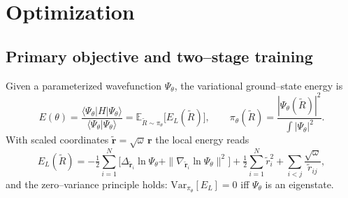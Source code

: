\chapter{Optimization}
\label{ch:optimization}

\section{Primary objective and two–stage training}
\label{sec:opt-overview}

Given a parameterized wavefunction $\Psi_\theta$, the variational ground–state energy is
\begin{equation}
E(\theta)
=\frac{\langle\Psi_\theta|H|\Psi_\theta\rangle}{\langle\Psi_\theta|\Psi_\theta\rangle}
=\mathbb{E}_{\tilde{R}\sim \pi_\theta}\!\big[E_L(\tilde{R})\big],
\qquad
\pi_\theta(\tilde{R})=\frac{|\Psi_\theta(\tilde{R})|^2}{\int |\Psi_\theta|^2}.
\end{equation}
With scaled coordinates $\tilde{\mathbf r}=\sqrt{\omega}\,\mathbf r$ the local energy reads
\begin{equation}
\label{eq:local-energy}
E_L(\tilde{R})
= -\tfrac12\sum_{i=1}^N\!\Big[\Delta_{\tilde{\mathbf r}_i}\ln\Psi_\theta + \|\nabla_{\tilde{\mathbf r}_i}\ln\Psi_\theta\|^2\Big]
+\tfrac{1}{2}\sum_{i=1}^N \tilde r_i^2
+\sum_{i<j}\frac{\sqrt{\omega}}{\tilde r_{ij}},
\end{equation}
and the zero–variance principle holds: $\mathrm{Var}_{\pi_\theta}[E_L]=0$ iff $\Psi_\theta$ is an eigenstate.

